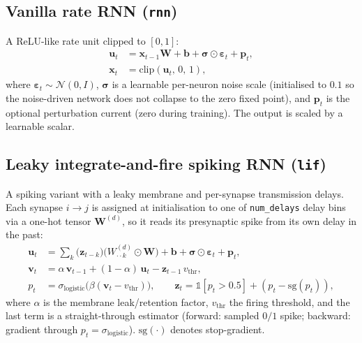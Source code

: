 \documentclass[11pt]{article}
\newcommand{\clip}{\mathrm{clip}}
\newcommand{\Wmat}{\mathbf{W}}
\newcommand{\xvec}{\mathbf{x}}
\newcommand{\code}[1]{\texttt{#1}}
\begin{document}
\subsection{Vanilla rate RNN (\code{rnn})}
A ReLU-like rate unit clipped to $[0,1]$:
\begin{align}
\mathbf{u}_t &= \xvec_{t-1}\Wmat + \mathbf{b} + \boldsymbol{\sigma}\odot\boldsymbol{\varepsilon}_t + \mathbf{p}_t, \\
\xvec_t &= \clip(\mathbf{u}_t,\, 0,\, 1),
\end{align}
where $\boldsymbol{\varepsilon}_t \sim \mathcal{N}(0,I)$, $\boldsymbol{\sigma}$ is
a learnable per-neuron noise scale (initialised to $0.1$ so the noise-driven
network does not collapse to the zero fixed point), and $\mathbf{p}_t$ is the
optional perturbation current (zero during training). The output is scaled by a
learnable scalar.

\subsection{Leaky integrate-and-fire spiking RNN (\code{lif})}
A spiking variant with a leaky membrane and per-synapse transmission delays.
Each synapse $i\!\to\!j$ is assigned at initialisation to one of
\code{num\_delays} delay bins via a one-hot tensor $\Wmat^{(d)}$, so it reads its
presynaptic spike from its own delay in the past:
\begin{align}
\mathbf{u}_t &= \textstyle\sum_{k} \big(\mathbf{z}_{t-k}\big)\big(W^{(d)}_{\cdot\cdot k}\odot \Wmat\big) + \mathbf{b} + \boldsymbol{\sigma}\odot\boldsymbol{\varepsilon}_t + \mathbf{p}_t, \\
\mathbf{v}_t &= \alpha\,\mathbf{v}_{t-1} + (1-\alpha)\,\mathbf{u}_t - \mathbf{z}_{t-1}\,v_{\mathrm{thr}}, \\
p_t &= \sigma_{\mathrm{logistic}}\!\big(\beta(\mathbf{v}_t - v_{\mathrm{thr}})\big), \qquad
\mathbf{z}_t = \mathbb{1}[p_t > 0.5] + (p_t - \mathrm{sg}(p_t)),
\end{align}
where $\alpha$ is the membrane leak/retention factor, $v_{\mathrm{thr}}$ the
firing threshold, and the last term is a straight-through estimator (forward:
sampled $0/1$ spike; backward: gradient through $p_t = \sigma_{\mathrm{logistic}}$).
$\mathrm{sg}(\cdot)$ denotes stop-gradient.
\end{document}
